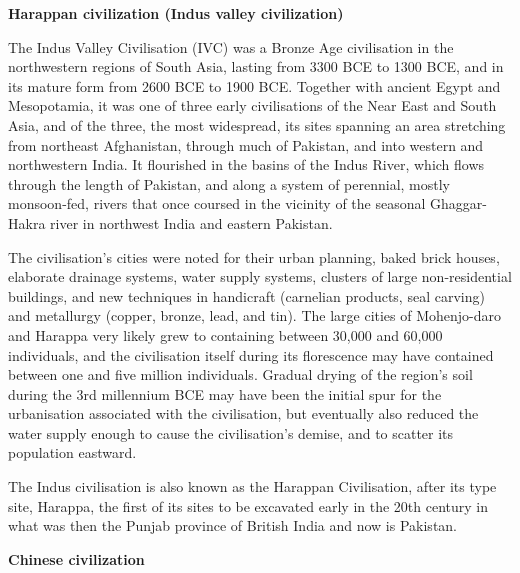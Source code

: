 \documentclass[
  openany]{book}
\begin{document}
\textbf{Harappan civilization (Indus valley civilization)}

The Indus Valley Civilisation (IVC) was a Bronze Age civilisation in the northwestern regions of South Asia, lasting from 3300 BCE to 1300 BCE, and in its mature form from 2600 BCE to 1900 BCE. Together with ancient Egypt and Mesopotamia, it was one of three early civilisations of the Near East and South Asia, and of the three, the most widespread, its sites spanning an area stretching from northeast Afghanistan, through much of Pakistan, and into western and northwestern India. It flourished in the basins of the Indus River, which flows through the length of Pakistan, and along a system of perennial, mostly monsoon-fed, rivers that once coursed in the vicinity of the seasonal Ghaggar-Hakra river in northwest India and eastern Pakistan.

The civilisation's cities were noted for their urban planning, baked brick houses, elaborate drainage systems, water supply systems, clusters of large non-residential buildings, and new techniques in handicraft (carnelian products, seal carving) and metallurgy (copper, bronze, lead, and tin). The large cities of Mohenjo-daro and Harappa very likely grew to containing between 30,000 and 60,000 individuals, and the civilisation itself during its florescence may have contained between one and five million individuals. Gradual drying of the region's soil during the 3rd millennium BCE may have been the initial spur for the urbanisation associated with the civilisation, but eventually also reduced the water supply enough to cause the civilisation's demise, and to scatter its population eastward.

The Indus civilisation is also known as the Harappan Civilisation, after its type site, Harappa, the first of its sites to be excavated early in the 20th century in what was then the Punjab province of British India and now is Pakistan.

\textbf{Chinese civilization}
\end{document}
